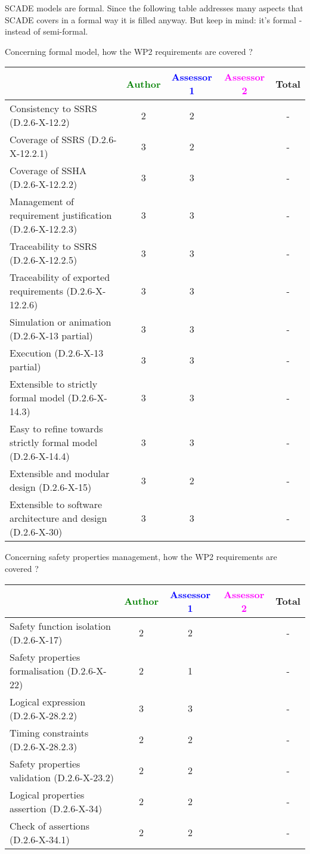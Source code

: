\begin{author_comment}
SCADE models are formal. Since the following table addresses many aspects that SCADE covers in a formal way it is filled anyway. But keep in mind: it's formal - instead of semi-formal.  
\end{author_comment}


Concerning formal model, how the WP2 requirements are covered ?

\begin{tabular}{|l | c | c | c | c|}
\hline
& \textcolor{green}{Author} & \textcolor{blue}{Assessor 1} & \textcolor{magenta}{Assessor 2} & Total \\
\hline 
Consistency to SSRS (D.2.6-X-12.2) & 2 & 2 & & - \\
\hline
Coverage of SSRS (D.2.6-X-12.2.1)  & 3 & 2 & & - \\
\hline
Coverage of SSHA (D.2.6-X-12.2.2)  &  3& 3 & & - \\
\hline
Management of requirement justification (D.2.6-X-12.2.3)  &
3& 3 & & - \\
\hline
Traceability to  SSRS (D.2.6-X-12.2.5)  &  3& 3 & & - \\
\hline
Traceability of exported requirements (D.2.6-X-12.2.6)  &
3& 3 & & - \\
\hline
Simulation or animation (D.2.6-X-13 partial)  &  3&
3& & - \\
\hline
Execution (D.2.6-X-13 partial)  & 3 & 3 & & - \\
\hline
Extensible to strictly formal model (D.2.6-X-14.3) &
3  & 3 & & - \\
\hline
Easy to  refine towards strictly formal model (D.2.6-X-14.4) &
3 & 3 & & - \\
\hline
Extensible and modular design (D.2.6-X-15)  & 3 & 2 & & - \\
\hline
Extensible to software architecture and design (D.2.6-X-30)   &
3& 3 & & - \\
\hline
\end{tabular}

Concerning safety properties management, how the WP2 requirements are covered ?

\begin{tabular}{|l | c | c | c | c|}
\hline
& \textcolor{green}{Author} & \textcolor{blue}{Assessor 1} & \textcolor{magenta}{Assessor 2} & Total \\
\hline 
Safety function isolation (D.2.6-X-17)  &  2& 2 & & - \\
\hline 
Safety properties formalisation (D.2.6-X-22)  &  2&
1 & & - \\
\hline
Logical expression (D.2.6-X-28.2.2)  &  3& 3 & & - \\
\hline
Timing constraints (D.2.6-X-28.2.3)  &  2 & 2 & & - \\
\hline
Safety properties validation (D.2.6-X-23.2)  &  2& 2 & & - \\
\hline
Logical properties assertion (D.2.6-X-34)  &  2& 2 & & - \\
\hline
Check  of assertions (D.2.6-X-34.1)  &  2& 2 & & - \\
\hline
\end{tabular}

